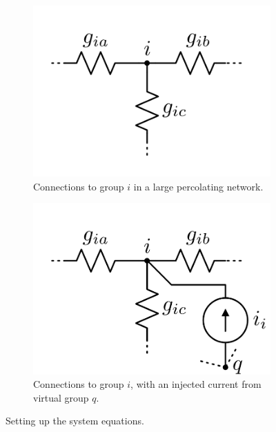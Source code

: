 \documentclass[11pt]{article}
\begin{document}
\begin{figure}[!htbp]
\centering
\begin{subfigure}{.4\textwidth}
  \centering
  \includegraphics[width=\linewidth]{figures/circuit2.png}
  \caption{\centering Connections to group $i$ in a large percolating network.}
  \label{fig:a}
\end{subfigure}%
\begin{subfigure}{.4\textwidth}
  \centering
  \includegraphics[width=\linewidth]{figures/circuit.png}
  \caption{\centering Connections to group $i$, with an injected current from virtual group $q$.}
  \label{fig:b}
\end{subfigure}
\caption{Setting up the system equations.}
\label{fig:viewline}
\end{figure}
\end{document}

